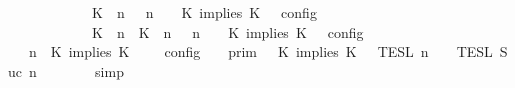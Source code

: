 \begin{isabellebody}
\ \ \ \ \ \ \ \ \ \ {\isacharequal}\ {\isasymlbrakk}\ {\isacharparenleft}{\isacharparenleft}K\ {\isasymnot}{\isasymUp}\ n{\isacharparenright}\ {\isacharhash}\ {\isasymGamma}{\isacharparenright}{\isacharcomma}\ n\ {\isasymturnstile}\ {\isasymPsi}\ {\isasymtriangleright}\ {\isacharparenleft}{\isacharparenleft}K\ implies\ K\ {\isacharhash}\ {\isasymPhi}{\isacharparenright}\ {\isasymrbrakk}\isactrlsub c\isactrlsub o\isactrlsub n\isactrlsub f\isactrlsub i\isactrlsub g\isanewline
\ \ \ \ \ \ \ \ \ \ {\isasymunion}\ {\isasymlbrakk}\ {\isacharparenleft}{\isacharparenleft}K\ {\isasymUp}\ n{\isacharparenright}\ {\isacharhash}\ {\isacharparenleft}K\ {\isasymUp}\ n{\isacharparenright}\ {\isacharhash}\ {\isasymGamma}{\isacharparenright}{\isacharcomma}\ n\ {\isasymturnstile}\ {\isasymPsi}\ {\isasymtriangleright}\ {\isacharparenleft}{\isacharparenleft}K\ implies\ K\ {\isacharhash}\ {\isasymPhi}{\isacharparenright}\ {\isasymrbrakk}\isactrlsub c\isactrlsub o\isactrlsub n\isactrlsub f\isactrlsub i\isactrlsub g{\isacartoucheclose}\isanewline
%
\isadelimproof
\ \ %
\endisadelimproof
%
\isatagproof
{}\isamarkupfalse%
\ {\isacharminus}\isanewline
\ \ \ \ \isamarkupfalse%
\ {\isacartoucheopen}{\isasymlbrakk}\ {\isasymGamma}{\isacharcomma}\ n\ {\isasymturnstile}\ {\isacharparenleft}K\ implies\ K\ {\isacharhash}\ {\isasymPsi}\ {\isasymtriangleright}\ {\isasymPhi}\ {\isasymrbrakk}\isactrlsub c\isactrlsub o\isactrlsub n\isactrlsub f\isactrlsub i\isactrlsub g\ {\isacharequal}\ {\isasymlbrakk}{\isasymlbrakk}\ {\isasymGamma}\ {\isasymrbrakk}{\isasymrbrakk}\isactrlsub p\isactrlsub r\isactrlsub i\isactrlsub m\ {\isasyminter}\ {\isasymlbrakk}{\isasymlbrakk}\ {\isacharparenleft}K\ implies\ K\ {\isacharhash}\ {\isasymPsi}\ {\isasymrbrakk}{\isasymrbrakk}\isactrlsub T\isactrlsub E\isactrlsub S\isactrlsub L\isactrlbsup {\isasymge}\ n\isactrlesup \ {\isasyminter}\ {\isasymlbrakk}{\isasymlbrakk}\ {\isasymPhi}\ {\isasymrbrakk}{\isasymrbrakk}\isactrlsub T\isactrlsub E\isactrlsub S\isactrlsub L\isactrlbsup {\isasymge}\ Suc\ n\isactrlesup {\isacartoucheclose}\isanewline
\ \ \ \ \ \ \isamarkupfalse%
\ simp\isanewline
\ \ \ \ \isamarkupfalse%
\ \isamarkupfalse%

\end{isabellebody}
